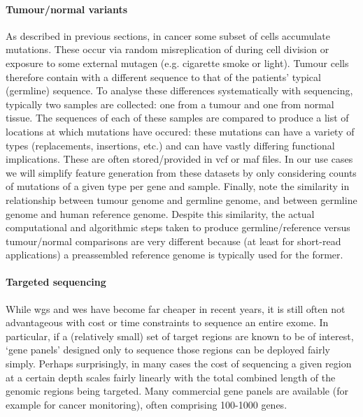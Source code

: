 \documentclass[thesis.tex]{subfiles}
\begin{document}
\paragraph{Tumour/normal variants}
As described in previous sections, in cancer some subset of cells accumulate mutations. These occur via random misreplication of  during cell division or exposure to some external mutagen (e.g. cigarette smoke or  light). Tumour cells therefore contain  with a different sequence to that of the patients' typical (germline) sequence. To analyse these differences systematically with sequencing, typically two samples are collected: one from a tumour and one from normal tissue. The sequences of each of these samples are compared to produce a list of locations at which mutations have occured: these mutations can have a variety of types (replacements, insertions, etc.) and can have vastly differing functional implications. These are often stored/provided in \gls{vcf} or \gls{maf} files. In our use cases we will simplify feature generation from these datasets by only considering counts of mutations of a given type per gene and sample. Finally, note the similarity in relationship between tumour genome and germline genome, and between germline genome and human reference genome. Despite this similarity, the actual computational and algorithmic steps taken to produce germline/reference versus tumour/normal comparisons are very different because (at least for short-read applications) a preassembled reference genome is typically used for the former.

\paragraph{Targeted sequencing}
While \gls{wgs} and \gls{wes} have become far cheaper in recent years, it is still often not advantageous with cost or time constraints to sequence an entire exome. In particular, if a (relatively small) set of target regions are known to be of interest, `gene panels' designed only to sequence those regions can be deployed fairly simply. Perhaps surprisingly, in many cases the cost of sequencing a given region at a certain depth scales fairly linearly with the total combined length of the genomic regions being targeted. Many commercial gene panels are available (for example for cancer monitoring), often comprising 100-1000 genes.
\end{document}
